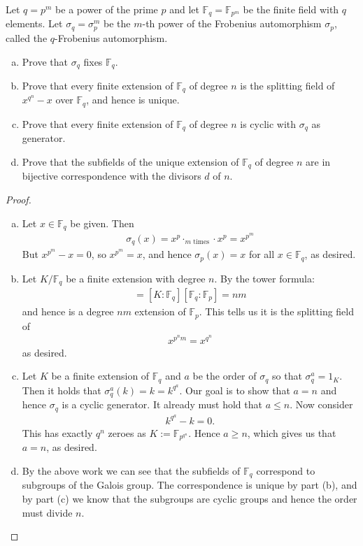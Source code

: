 \documentclass[num=12,duedate=04-28-21,course=Algebra\ II,proflastname=Walton]{hwtemplate}
\begin{document}
\problem[4] %
\begin{claim}
	Let \(q = p^{m}\) be a power of the prime \(p\) and let \(\mathbb{F}_q = \mathbb{F}_{p^{m}}\) be the finite field with \(q\) elements. Let \(\sigma_q = \sigma_p^{m}\) be the \(m\)-th power of the Frobenius automorphism \(\sigma_p\), called the \(q\)-Frobenius automorphism.
	\begin{enumerate}[(a).]
		\item Prove that \(\sigma_q\) fixes \(\mathbb{F}_q\).
		\item Prove that every finite extension of \(\mathbb{F}_q\) of degree \(n\) is the splitting field of \(x^{q^{n}}-x\) over \(\mathbb{F}_q\), and hence is unique.
		\item Prove that every finite extension of \(\mathbb{F}_q\) of degree \(n\) is cyclic with \(\sigma_q\) as generator.
		\item Prove that the subfields of the unique extension of \(\mathbb{F}_q\) of degree \(n\) are in bijective correspondence with the divisors \(d\) of \(n\).
	\end{enumerate}
\end{claim}
\begin{proof}
	\begin{enumerate}[(a).]
		\item Let \(x \in \mathbb{F}_q\) be given. Then
			\begin{align*}
				\sigma_q(x) = x^{p}\cdot_{m \text{ times}}\cdot x^{p} = x^{p^{m}}
			\end{align*}
			But \(x^{p^{m}}-x = 0\), so \(x^{p^{m}}= x\), and hence \(\sigma_p(x) = x\) for all \(x \in \mathbb{F}_q\), as desired.
		\item Let \(K / \mathbb{F}_q\) be a finite extension with degree \(n\). By the tower formula:
			\begin{align*}
				[K : \mathbb{F}_p] = [K : \mathbb{F}_q] [\mathbb{F}_q : \mathbb{F}_p] = nm
			\end{align*}
			and hence is a degree \(nm\) extension of \(\mathbb{F}_p\). This tells us it is the splitting field of
			\begin{align*}
				x^{p^{n}m}= x^{q^{n}}
			\end{align*}
			as desired.
		\item Let \(K\) be a finite extension of \(\mathbb{F}_q\) and \(a\) be the order of \(\sigma_q\) so that \(\sigma_q^{a}= 1_K\). Then it holds that \(\sigma^{a}_q(k) = k = k^{q^{a}}\). Our goal is to show that \(a=n\) and hence \(\sigma_q\) is a cyclic generator. It already must hold that \(a\leq n\). Now consider
			\begin{align*}
				k^{q^{a}}-k = 0.
			\end{align*}
			This has exactly \(q^{n}\) zeroes as \(K := \mathbb{F}_{p^{q^{n}}}\). Hence \(a\geq n\), which gives us that \(a=n\), as desired.
		\item By the above work we can see that the subfields of \(\mathbb{F}_q\) correspond to subgroups of the Galois group. The correspondence is unique by part (b), and by part (c) we know that the subgroups are cyclic groups and hence the order must divide \(n\).
	\end{enumerate}
\end{proof}
\end{document}
